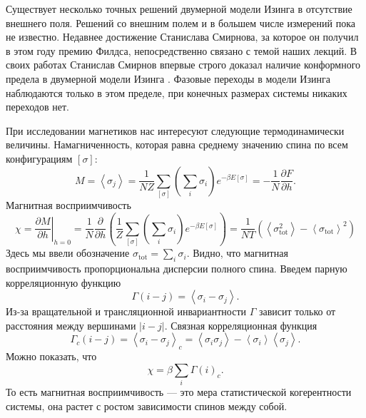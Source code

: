 \documentclass[a4paper,12pt]{article}
\theoremstyle{definition}
\theoremstyle{definition}
\theoremstyle{definition}
\begin{document}
Существует несколько точных решений двумерной модели Изинга в отсутствие внешнего поля. Решений со внешним полем и в большем числе измерений пока не известно. Недавнее достижение Станислава Смирнова, за которое он получил в этом году премию Филдса, непосредственно связано с темой наших лекций. В своих работах Станислав Смирнов впервые строго доказал наличие конформного предела в двумерной модели Изинга \cite{smirnov2007conformal,smirnov2006towards,smirnov2001critical}.
Фазовые переходы в модели Изинга наблюдаются только в этом пределе, при конечных размерах системы никаких переходов нет.

При исследовании магнетиков нас интересуют следующие термодинамически величины.
Намагниченность, которая равна среднему значению спина по всем конфигурациям $[\sigma]$:
\begin{equation}
  \label{eq:7}
  M=\left<\sigma_j\right>=\frac{1}{NZ}\sum_{[\sigma]}\left(\sum_i\sigma_i\right)e^{-\beta E[\sigma]}=-\frac{1}{N}\frac{\partial F}{\partial h}.
\end{equation}
Магнитная восприимчивость
\begin{equation}
  \label{eq:8}
  \chi=\left.\frac{\partial M}{\partial h}\right|_{h=0}=\frac{1}{N}\frac{\partial}{\partial h}\left(\frac{1}{Z}\sum_{[\sigma]}\left(\sum_i \sigma_i\right)e^{-\beta E[\sigma]}\right)=\frac{1}{NT}\left(\left<\sigma_{\mathrm{tot}}^2\right>-\left<\sigma_{\mathrm{tot}}\right>^2\right)
\end{equation}
Здесь мы ввели обозначение $\sigma_{\mathrm{tot}}=\sum_i \sigma_i$. Видно, что магнитная восприимчивость пропорциональна дисперсии полного спина. Введем парную корреляционную функцию
\begin{equation}
  \label{eq:9}
  \Gamma(i-j)=\left<\sigma_i-\sigma_j\right>.
\end{equation}
Из-за вращательной и трансляционной инвариантности $\Gamma$ зависит только от расстояния между вершинами $\left|i-j\right|$. Связная корреляционная функция
\begin{equation}
  \label{eq:10}
  \Gamma_c(i-j)=\left<\sigma_i-\sigma_j\right>_c=\left<\sigma_i\sigma_j\right>-\left<\sigma_i\right>\left<\sigma_j\right>.
\end{equation}
Можно показать, что
\begin{equation}
  \label{eq:11}
  \chi=\beta\sum_i\Gamma(i)_c.
\end{equation}
То есть магнитная восприимчивость --- это мера статистической когерентности системы, она растет с ростом зависимости спинов между собой.
\end{document}
